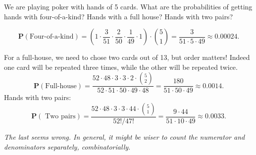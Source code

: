 \begin{qanda} %
  \Q
  We are playing poker with hands of 5 cards.
  What are the probabilities of getting hands with four-of-a-kind? 
  Hands with a full house?
  Hands with two pairs?

  \A
  \[
  \mathbf{P}(\text{Four-of-a-kind}) =  
  \left( 1 \cdot \frac{3}{51} \cdot \frac{2}{50} \cdot \frac{1}{49}  \cdot 1 \right) \cdot \binom{5}{1} = \frac{3}{51\cdot 5\cdot 49} \approx 0.00024.
  \]

  For a full-house, we need to chose two cards out of 13, but order matters!
  Indeed one card will be repeated three times, while the other will be repeated twice.
  \[
  \mathbf{P}(\text{Full-house}) =  \frac{52 \cdot 48 \cdot 3 \cdot  3 \cdot  2 \cdot \binom{5}{2} }{52 \cdot 51 \cdot  50 \cdot  49 \cdot  48} = \frac{180}{51\cdot 50\cdot 49} \approx 0.0014.
  \]
  Hands with two pairs: %
  \[
  \mathbf{P}( \text{ Two pairs} )  = \frac{52 \cdot 48 \cdot  3 \cdot  3 \cdot 44 \cdot \binom{5}{1}}{52! / 47!} = \frac{9 \cdot  44}{ 51 \cdot 10 \cdot 49} \approx 0.0033.
  \]

  \emph{The last seems wrong. In general, it might be wiser to count the numerator and denominators separately, combinatorially.}
\end{qanda}

